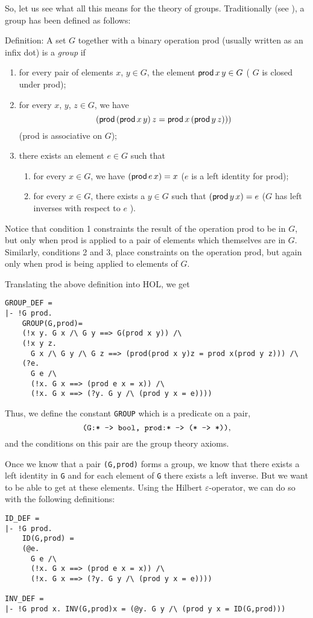 So, let us see what all this means for the theory of groups.
Traditionally (see \cite{Huppert,Herstein}), a group has been defined
as follows:
\begin{display}{Definition:}
A set $G$ together with a binary operation {\sf prod} (usually written
as an infix dot) is a {\it group\/} if
\begin{enumerate}
\item for every pair of elements $x$, $y\in G$, the element
${\sf prod}\,x\,y\in G$ ( $G$ is closed under {\sf prod});
\item for every $x$, $y$, $z\in G$, we have
$$({\sf prod}\,({\sf prod}\,x\,y)\,z = {\sf prod}\,x\,({\sf prod}\,y\,z)))$$
  ({\sf prod} is associative on $G$);
\item there exists an element $e\in G$ such that
\begin{enumerate}
  \item for every $x\in G$, we have $({\sf prod}\,e\,x) = x$ ($e$ is a
    left identity for {\sf prod});
  \item for every $x\in G$, there exists a $y\in G$ such that
    $({\sf prod}\,y\,x) = e$ ($G$ has left inverses with respect to $e$ ).
\end{enumerate}
\end{enumerate}
\end{display}
Notice that condition 1 constraints the result of the operation {\sf prod}
to be in $G$, but only when {\sf prod} is applied to a pair of elements
which themselves are in $G$.  Similarly, conditions 2 and 3, place constraints
on the operation {\sf prod}, but again only when {\sf prod} is being applied
to elements of $G$.

Translating the above definition into HOL, we get 
\begin{verbatim}
GROUP_DEF = 
|- !G prod. 
    GROUP(G,prod)=
    (!x y. G x /\ G y ==> G(prod x y)) /\
    (!x y z. 
      G x /\ G y /\ G z ==> (prod(prod x y)z = prod x(prod y z))) /\
    (?e.
      G e /\
      (!x. G x ==> (prod e x = x)) /\
      (!x. G x ==> (?y. G y /\ (prod y x = e))))
\end{verbatim}
Thus, we define the constant {\tt GROUP} which is a predicate on a pair,
$$\mbox{\tt (G:* -> bool, prod:* -> (* -> *))},$$
and the conditions on this pair are the group theory axioms.

Once we know that a pair {\tt (G,prod)} forms a group, we know
that there exists a left identity in {\tt G} and for each element of {\tt G}
there exists a left inverse.  But we want to be able to get at these
elements.  Using the Hilbert $\varepsilon$-operator, we can do so with
the following definitions:
\begin{verbatim}
ID_DEF = 
|- !G prod.
    ID(G,prod) =
    (@e.
      G e /\
      (!x. G x ==> (prod e x = x)) /\
      (!x. G x ==> (?y. G y /\ (prod y x = e))))

INV_DEF = 
|- !G prod x. INV(G,prod)x = (@y. G y /\ (prod y x = ID(G,prod)))
\end{verbatim}

